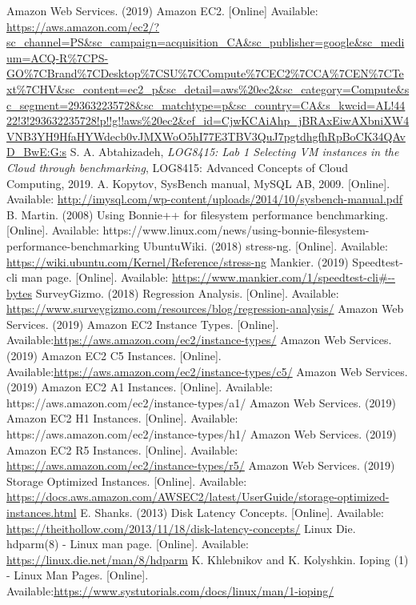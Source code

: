 \documentclass[11pt]{article}
\begin{document}
\begin{thebibliography} {}
	 Amazon Web Services. (2019) Amazon EC2. [Online] Available: \url{https://aws.amazon.com/ec2/?sc_channel=PS&sc_campaign=acquisition_CA&sc_publisher=google&sc_medium=ACQ-R%7CPS-GO%7CBrand%7CDesktop%7CSU%7CCompute%7CEC2%7CCA%7CEN%7CText%7CHV&sc_content=ec2_p&sc_detail=aws%20ec2&sc_category=Compute&sc_segment=293632235728&sc_matchtype=p&sc_country=CA&s_kwcid=AL!4422!3!293632235728!p!!g!!aws%20ec2&ef_id=CjwKCAiAhp_jBRAxEiwAXbniXW4VNB3YH9HfaHYWdecb0vJMXWoO5hI77E3TBV3QuJ7pgtdhgfhRpBoCK34QAvD_BwE:G:s}
	 S. A. Abtahizadeh, \emph{LOG8415: Lab 1 Selecting VM instances in the Cloud through benchmarking}, LOG8415: Advanced Concepts of Cloud Computing, 2019.
	 A. Kopytov, SysBench manual, MySQL AB, 2009. [Online]. Available: \url{http://imysql.com/wp-content/uploads/2014/10/sysbench-manual.pdf}
	 B. Martin. (2008) Using Bonnie++ for filesystem performance benchmarking. [Online]. Available: https://www.linux.com/news/using-bonnie-filesystem-performance-benchmarking
	 UbuntuWiki. (2018) stress-ng. [Online]. Available: \url{https://wiki.ubuntu.com/Kernel/Reference/stress-ng}
	 Mankier. (2019) Speedtest-cli man page. [Online]. Available: \url{https://www.mankier.com/1/speedtest-cli#--bytes}
	 SurveyGizmo. (2018) Regression Analysis. [Online]. Available: \url{https://www.surveygizmo.com/resources/blog/regression-analysis/}
	 Amazon Web Services. (2019) Amazon EC2 Instance Types. [Online]. Available:\url{https://aws.amazon.com/ec2/instance-types/}
	 Amazon Web Services. (2019) Amazon EC2 C5 Instances. [Online]. Available:\url{https://aws.amazon.com/ec2/instance-types/c5/}
	 Amazon Web Services. (2019) Amazon EC2 A1 Instances. [Online]. Available: https://aws.amazon.com/ec2/instance-types/a1/
	 Amazon Web Services. (2019) Amazon EC2 H1 Instances. [Online]. Available:  https://aws.amazon.com/ec2/instance-types/h1/
	 Amazon Web Services. (2019) Amazon EC2 R5 Instances. [Online]. Available: \url{https://aws.amazon.com/ec2/instance-types/r5/}
	 Amazon Web Services. (2019) Storage Optimized Instances. [Online]. Available: \url{https://docs.aws.amazon.com/AWSEC2/latest/UserGuide/storage-optimized-instances.html}
	 E. Shanks. (2013) Disk Latency Concepts. [Online]. Available: \url{https://theithollow.com/2013/11/18/disk-latency-concepts/}
	 Linux Die. hdparm(8) - Linux man page. [Online]. Available: \url{https://linux.die.net/man/8/hdparm}
	 K. Khlebnikov and K. Kolyshkin. Ioping (1) - Linux Man Pages. [Online]. Available:\url{https://www.systutorials.com/docs/linux/man/1-ioping/}
\end{thebibliography}
\end{document}
